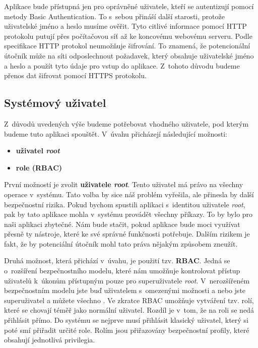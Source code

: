 Aplikace bude přístupná jen pro oprávněné uživatele, kteří se autentizují pomocí metody Basic Authentication. To s~sebou přináší další starosti, protože uživatelské jméno a heslo musíme ověřit. Tyto citlivé informace pomocí HTTP protokolu putují přes počítačovou síť až ke koncovému webovému serveru. Podle specifikace \cite{RFC2616} HTTP protokol neumožňuje šifrování. To znamená, že potencionální útočník může na síti odposlechnout požadavek, který obsahuje uživatelské jméno a heslo a použít tyto údaje pro vstup do aplikace. Z~tohoto důvodu budeme přenos dat šifrovat pomocí HTTPS protokolu.
    \subsection{Systémový uživatel}
    \label{sysuser}
    Z~důvodů uvedených výše budeme potřebovat vhodného uživatele, pod kterým budeme tuto aplikaci spouštět. V~úvahu přicházejí následující možnosti:
    \begin{itemize}
      \item \textbf{uživatel \emph{root}}
      \item \textbf{role (RBAC)}
    \end{itemize}

    První možností je zvolit \textbf{uživatele \emph{root}}. Tento uživatel má právo na všechny operace v~systému. Tato volba by sice náš problém vyřešila, ale přinesla by další bezpečnostní rizika. Pokud bychom spustili aplikaci s~identitou uživatele \emph{root}, pak by tato aplikace mohla v~systému provádět všechny příkazy. To by bylo pro naši aplikaci zbytečné. Nám bude stačit, pokud aplikace bude moci využívat přesně ty nástroje, které ke své správné funkčnosti potřebuje. Dalším rizikem je fakt, že by potenciální útočník mohl tato práva nějakým způsobem zneužít.

    Druhá možnost, která přichází v~úvahu, je použití tzv. \textbf{RBAC}. Jedná se o~rozšíření bezpečnostního modelu, které nám umožňuje kontrolovat přístup uživatelů k~úkonům přístupným pouze pro superuživatele \emph{root}. V~nerozšířeném bezpečnostním modelu jste buď uživatelem s~omezenými možnosti a nebo jste superuživatel a můžete všechno \cite{RBAC}. Ve zkratce RBAC umožňuje vytváření tzv. rolí, které se chovají téměř jako normální uživatel. Rozdíl je v~tom, že na roli se nedá přihlásit přímo. Do systému se nejprve musí přihlásit klasický uživatel, který si poté smí přiřadit určité role. Rolím jsou přiřazovány bezpečnostní profily, které obsahují jednotlivá privilegia.


